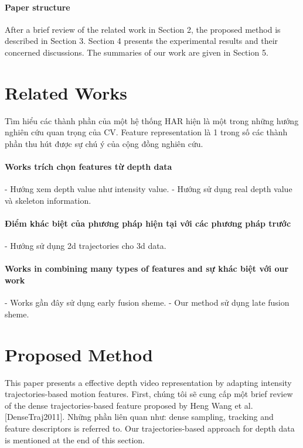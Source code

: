 \documentclass[review]{elsarticle}
\begin{document}
\paragraph{Paper structure}After a brief review of the related work in Section 2, the proposed method is described in Section 3. Section 4 presents the experimental results and their concerned discussions. The summaries of our work are given in Section 5.

\section{Related Works}

Tìm hiểu các thành phần của một hệ thống HAR hiện là một trong những hướng nghiên cứu quan trọng của CV.
Feature representation là 1 trong số các thành phần thu hút được sự chú ý của cộng đồng nghiên cứu.

\paragraph{Works trích chọn features từ depth data}
- Hướng xem depth value như intensity value.
- Hướng sử dụng real depth value và skeleton information.

\paragraph{Điểm khác biệt của phương pháp hiện tại với các phương pháp trước}
- Hướng sử dụng 2d trajectories cho 3d data.

\paragraph{Works in combining many types of features and sự khác biệt với our work}
- Works gần đây sử dụng early fusion sheme.
- Our method sử dụng late fusion sheme.

\section{Proposed Method}
This paper presents a effective depth video representation by adapting intensity trajectories-based motion features. First, chúng tôi sẽ cung cấp một brief review of the dense trajectories-based feature proposed by Heng Wang et al. [DenseTraj2011]. Những phần liên quan như: dense sampling, tracking and feature descriptors is referred to. Our trajectories-based approach for depth data is mentioned at the end of this section.
\end{document}
